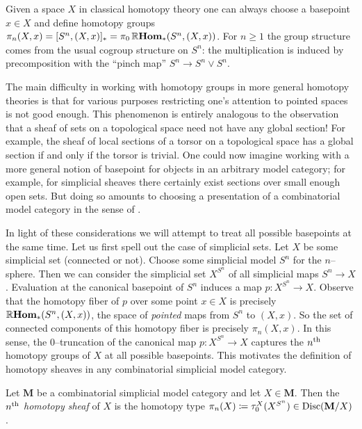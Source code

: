 Given a space \(X\) in classical homotopy theory one can always choose a basepoint \(x\in X\) and define homotopy groups \(\pi_{n}(X,x) = [S^{n}, (X,x)]_{*} = \pi_{0}\operatorname{\mathbb{R}\textnormal{\bfseries Hom}}_{*}(S^{n}, (X,x))\). For \(n\geq 1\) the group structure comes from the usual cogroup structure on \(S^{n}\): the multiplication is induced by precomposition with the \enquote{pinch map} \(S^{n}\to S^{n}\vee S^{n}\).

The main difficulty in working with homotopy groups in more general homotopy theories is that for various purposes restricting one's attention to pointed spaces is not good enough. This phenomenon is entirely analogous to the observation that a sheaf of sets on a topological space need not have any global section! For example, the sheaf of local sections of a torsor on a topological space has a global section if and only if the torsor is trivial. One could now imagine working with a more general notion of basepoint for objects in an arbitrary model category; for example, for simplicial sheaves there certainly exist sections over small enough open sets. But doing so amounts to choosing a presentation of a combinatorial model category in the sense of \cite{mr1870516}.

In light of these considerations we will attempt to treat all possible basepoints at the same time. Let us first spell out the case of simplicial sets. Let \(X\) be some simplicial set (connected or not). Choose some simplicial model \(S^{n}\) for the \(n\)--sphere. Then we can consider the simplicial set \(X^{S^{n}}\) of all simplicial maps \(S^{n}\to X\). Evaluation at the canonical basepoint of \(S^{n}\) induces a map \(p\colon X^{S^{n}}\to X\). Observe that the homotopy fiber of \(p\) over some point \(x\in X\) is precisely \(\operatorname{\mathbb{R}\textnormal{\bfseries Hom}}_{*}(S^{n}, (X,x))\), the space of \emph{pointed} maps from \(S^{n}\) to \((X,x)\). So the set of connected components of this homotopy fiber is precisely \(\pi_{n}(X,x)\). In this sense, the \(0\)--truncation of the canonical map \(p\colon X^{S^{n}}\to X\) captures the \(n\textsuperscript{th}\) homotopy groups of \(X\) at all possible basepoints. This motivates the definition of homotopy sheaves in any combinatorial simplicial model category.

\begin{definition}
  Let \(\mathbf M\) be a combinatorial simplicial model category and let \(X\in\mathbf M\). Then the \emph{\(n\textsuperscript{th}\) homotopy sheaf} of \(X\) is the homotopy type \(\pi_{n}(X)\coloneqq\tau_{0}^{X}(X^{S^{n}})\in\operatorname{\textnormal{Disc}}(\mathbf M/X)\).
\end{definition}

